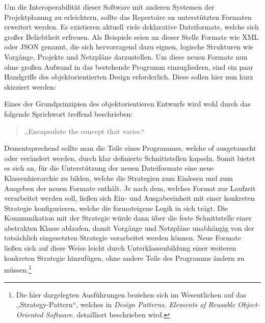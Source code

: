 Um die Interoperabilit\"at dieser Software mit anderen Systemen der
Projektplanung zu erleichtern, sollte das Repertoire an
unterst\"utzten Formaten erweitert werden. Es existieren aktuell viele
deklarative Dateiformate, welche sich gro{\ss}er Beliebtheit
erfreuen. Als Beispiele seien an dieser Stelle Formate wie XML oder
JSON genannt, die sich hervorragend dazu eignen, logische Strukturen
wie Vorg\"ange, Projekte und Netzpl\"ane darzustellen. Um diese neuen
Formate nun ohne gro{\ss}en Aufwand in das bestehende Programm
einzugliedern, sind ein paar Handgriffe des objektorientierten Design
erforderlich. Diese sollen hier nun kurz skizziert werden:

Eines der Grundprinzipien des objektorientieren Entwurfs wird wohl
durch das folgende Sprichwort treffend beschrieben:
\begin{quotation}
,,Encapsulate the concept that varies.``
\end{quotation}
Dementsprechend sollte man die Teile eines Programmes, welche of
ausgetauscht oder ver\"andert werden, durch klar definierte
Schnittstellen kapseln. Somit bietet es sich an, f\"ur die
Unterst\"utzung der neuen Dateiformate eine neue Klassenhierarchie zu
bilden, welche die Strategien zum Einlesen und zum Ausgeben der neuen
Formate enth\"alt. Je nach dem, welches Format zur Laufzeit
verarbeitet werden soll, lie{\ss}en sich Ein- und Ausgabeeinheit mit
einer konkreten Strategie konfigurieren, welche die formateigene Logik
in sich tr\"agt. Die Kommunikation mit der Strategie w\"urde dann
\"uber die feste Schnittstelle einer abstrakten Klasse ablaufen, damit
Vorg\"ange und Netzpl\"ane unabh\"angig von der tats\"achlich
eingesetzten Strategie
verarbeitet werden k\"onnen. Neue Formate lie{\ss}en sich auf diese
Weise leicht durch Unterklassenbildung einer weiteren konkreten
Strategie hinzuf\"ugen, ohne andere Teile des Programms \"andern zu
m\"ussen.\footnote{Die hier dargelegten Ausf\"uhrungen beziehen sich
  im Wesentlichen auf das ,,Strategy-Pattern``, welches in
  \textit{Design Patterns. Elements of Reusable Object-Oriented
    Software.} detailliert beschrieben wird.}

